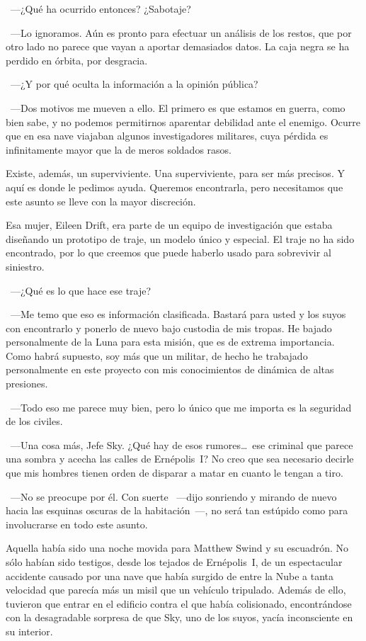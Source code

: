 ~---¿Qué ha ocurrido entonces? ¿Sabotaje?

~---Lo ignoramos. Aún es pronto para efectuar un análisis de los restos, que por otro lado no parece que vayan a aportar demasiados datos. La caja negra se ha perdido en órbita, por desgracia.

~---¿Y por qué oculta la información a la opinión pública?

~---Dos motivos me mueven a ello. El primero es que estamos en guerra, como bien sabe, y no podemos permitirnos aparentar debilidad ante el enemigo. Ocurre que en esa nave viajaban algunos investigadores militares, cuya pérdida es infinitamente mayor que la de meros soldados rasos.

\rquoti Existe, además, un superviviente. Una superviviente, para ser más precisos. Y aquí es donde le pedimos ayuda. Queremos encontrarla, pero necesitamos que este asunto se lleve con la mayor discreción.

\rquoti Esa mujer, Eileen Drift, era parte de un equipo de investigación que estaba diseñando un prototipo de traje, un modelo único y especial. El traje no ha sido encontrado, por lo que creemos que puede haberlo usado para sobrevivir al siniestro.

~---¿Qué es lo que hace ese traje?

~---Me temo que eso es información clasificada. Bastará para usted y los suyos con encontrarlo y ponerlo de nuevo bajo custodia de mis tropas. He bajado personalmente de la Luna para esta misión, que es de extrema importancia. Como habrá supuesto, soy más que un militar, de hecho he trabajado personalmente en este proyecto con mis conocimientos de dinámica de altas presiones.

~---Todo eso me parece muy bien, pero lo único que me importa es la seguridad de los civiles.

~---Una cosa más, Jefe Sky. ¿Qué hay de esos rumores\dots\ ese criminal que parece una sombra y acecha las calles de Ernépolis~I? No creo que sea necesario decirle que mis hombres tienen orden de disparar a matar en cuanto le tengan a tiro.

~---No se preocupe por él. Con suerte ~---dijo sonriendo y mirando de nuevo hacia las esquinas oscuras de la habitación~---, no será tan estúpido como para involucrarse en todo este asunto.

\bigskip\noindent
Aquella había sido una noche movida para Matthew Swind y su escuadrón. No sólo habían sido testigos, desde los tejados de Ernépolis~I, de un espectacular accidente causado por una nave que había surgido de entre la Nube a tanta velocidad que parecía más un misil que un vehículo tripulado. Además de ello, tuvieron que entrar en el edificio contra el que había colisionado, encontrándose con la desagradable sorpresa de que Sky, uno de los suyos, yacía inconsciente en su interior.


